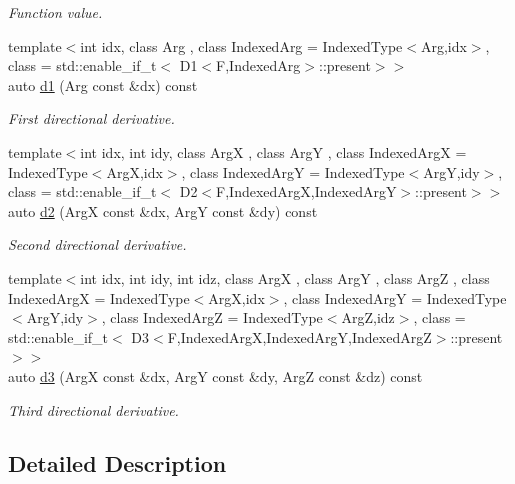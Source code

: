 \begin{DoxyCompactItemize}
\begin{DoxyCompactList}\small\item\em Function value. \end{DoxyCompactList}\item 
{\footnotesize template$<$int idx, class Arg , class Indexed\-Arg  = Indexed\-Type$<$\-Arg,idx$>$, class  = std\-::enable\-\_\-if\-\_\-t$<$ D1$<$\-F,\-Indexed\-Arg$>$\-::present$>$$>$ }\\auto \hyperlink{structFunG_1_1MathematicalOperations_1_1Scale_a63b6f3353439de0125836020bd2b15ba}{d1} (Arg const \&dx) const 
\begin{DoxyCompactList}\small\item\em First directional derivative. \end{DoxyCompactList}\item 
{\footnotesize template$<$int idx, int idy, class Arg\-X , class Arg\-Y , class Indexed\-Arg\-X  = Indexed\-Type$<$\-Arg\-X,idx$>$, class Indexed\-Arg\-Y  = Indexed\-Type$<$\-Arg\-Y,idy$>$, class  = std\-::enable\-\_\-if\-\_\-t$<$ D2$<$\-F,\-Indexed\-Arg\-X,\-Indexed\-Arg\-Y$>$\-::present$>$$>$ }\\auto \hyperlink{structFunG_1_1MathematicalOperations_1_1Scale_a79be0256e8b2b28c32dbcc9d3c098909}{d2} (Arg\-X const \&dx, Arg\-Y const \&dy) const 
\begin{DoxyCompactList}\small\item\em Second directional derivative. \end{DoxyCompactList}\item 
{\footnotesize template$<$int idx, int idy, int idz, class Arg\-X , class Arg\-Y , class Arg\-Z , class Indexed\-Arg\-X  = Indexed\-Type$<$\-Arg\-X,idx$>$, class Indexed\-Arg\-Y  = Indexed\-Type$<$\-Arg\-Y,idy$>$, class Indexed\-Arg\-Z  = Indexed\-Type$<$\-Arg\-Z,idz$>$, class  = std\-::enable\-\_\-if\-\_\-t$<$ D3$<$\-F,\-Indexed\-Arg\-X,\-Indexed\-Arg\-Y,\-Indexed\-Arg\-Z$>$\-::present $>$$>$ }\\auto \hyperlink{structFunG_1_1MathematicalOperations_1_1Scale_a8cb9d13e8bd87c2d4657ae1c075e7f39}{d3} (Arg\-X const \&dx, Arg\-Y const \&dy, Arg\-Z const \&dz) const 
\begin{DoxyCompactList}\small\item\em Third directional derivative. \end{DoxyCompactList}\end{DoxyCompactItemize}


\subsection{Detailed Description}
